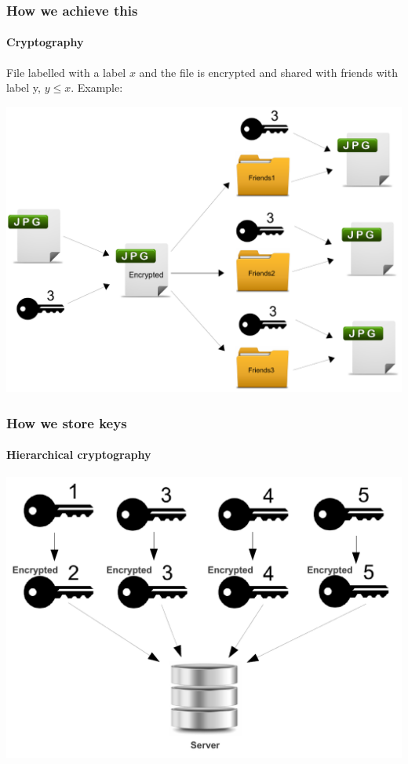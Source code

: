 \documentclass{beamer}
\begin{document}
  \begin{frame}
  	\frametitle{How we achieve this}
  	\framesubtitle{Cryptography}
  	File labelled with a label $x$ and the file is encrypted and shared with friends with label y, $y \leq x$. Example:
  	\begin{center}
 		\includegraphics[scale=0.40]{images/sharing/sharing_scissored.pdf}
 	\end{center}
  	
  \end{frame}
  
  \begin{frame}
  	\frametitle{How we store keys}
  	\framesubtitle{Hierarchical cryptography}
  	\begin{center}
  		\includegraphics[scale=0.5]{images/keyStorage/keyStorage_scissored.pdf}
  	\end{center}
  \end{frame}
  
\end{document}
